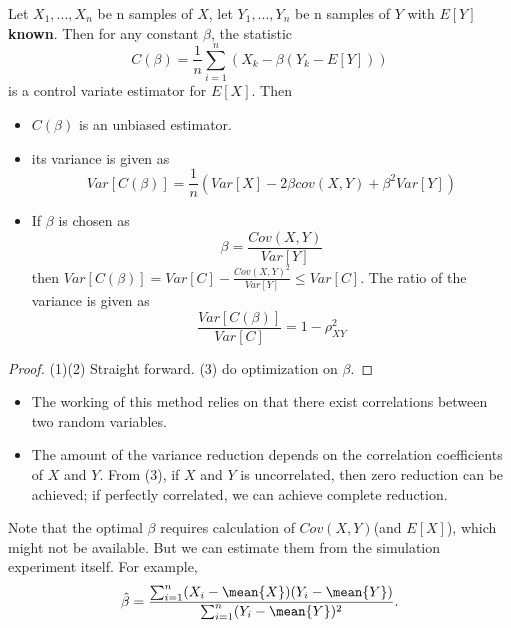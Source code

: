 \begin{refsection}
\begin{lemma}\cite[188]{glasserman2003monte}
	Let $X_1,...,X_n$ be n samples of $X$, let $Y_1,...,Y_n$ be n samples of $Y$ with $E[Y]$ \textbf{known}. Then for any constant $\beta$, the statistic
	$$C(\beta) = \frac{1}{n}\sum_{i=1}^n( X_k - \beta(Y_k - E[Y]))$$
	is a control variate estimator for $E[X]$. Then 
	\begin{itemize}
		\item $C(\beta)$ is an unbiased estimator.
		\item its variance is given as
		$$Var[C(\beta)] = \frac{1}{n}(Var[X] - 2\beta cov(X,Y) + \beta^2Var[Y])$$
		\item If $\beta$ is chosen as 
		$$\beta = \frac{Cov(X,Y)}{Var[Y]}$$
		then $Var[C(\beta)] = Var[C] - \frac{Cov(X,Y)^2}{Var[Y]} \leq Var[C]$. The ratio of the variance is given as
		$$\frac{Var[C(\beta)]}{Var[C]} = 1 - \rho_{XY}^2$$
	\end{itemize}
\end{lemma}
\begin{proof}
	(1)(2) Straight forward. (3) do optimization on $\beta$. 
\end{proof}

\begin{remark}[interpretation]\hfill
	\begin{itemize}
		\item The working of this method relies on that there exist correlations between two random variables.  
		\item The amount of the variance reduction depends on the correlation coefficients of $X$ and $Y$. From (3), if $X$ and $Y$ is uncorrelated, then zero reduction can be achieved; if perfectly correlated, we can achieve complete reduction. 
	\end{itemize}
\end{remark}





\begin{remark}
	Note that the optimal $\beta$ requires calculation of $Cov(X,Y)$(and $E[X]$), which might not be available. But we can estimate them from the simulation experiment itself. For example,
	$$\hat{\beta} = \frac{\sum_{i=1}^n (X_i - \mean{X})(Y_i - \mean{Y})}{\sum_{i=1}^n (Y_i - \mean{Y})^2}.$$
\end{remark}


\end{refsection}
